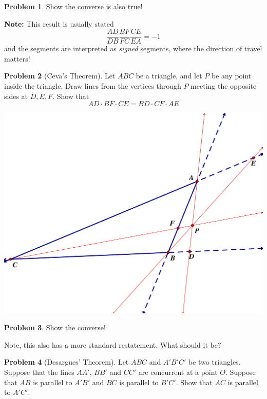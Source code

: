 \documentclass{tufte-handout}
\theoremstyle{definition}
\newtheorem{problem}{Problem}[section]
\begin{document}
\begin{problem}
Show the converse is also true!
\end{problem}

\noindent\textbf{Note:} This result is usually stated
\[ 
\dfrac{AD}{DB}\dfrac{BF}{FC}\dfrac{CE}{EA} = -1
\]
and the segments are interpreted as \emph{signed} segments, where the direction of travel matters!

\begin{problem}[Ceva's Theorem] \label{prob:Ceva-theorem}
Let $ABC$ be a triangle, and let $P$ be any point inside the triangle. Draw lines from the vertices through $P$ meeting the opposite sides at $D, E, F$. Show that 
\[ AD\cdot BF\cdot CE = BD \cdot CF \cdot AE \]
\end{problem}

\begin{center}
\includegraphics[width=.9\textwidth]{Ceva.pdf}
\end{center}

\begin{problem}
Show the converse!
\end{problem}

Note, this also has a more standard restatement. What should it be?


\begin{problem}[Desargues' Theorem]\label{prob:Desargue's-special-case}
Let $ABC$ and $A'B'C'$ be two triangles. Suppose that the lines $AA'$, $BB'$ and $CC'$ are concurrent at a point $O$. Suppose that $AB$ is parallel to $A'B'$ and $BC$ is parallel to $B'C'$. Show that $AC$ is parallel to $A'C'$.
\end{problem}



\vfill
\end{document}
